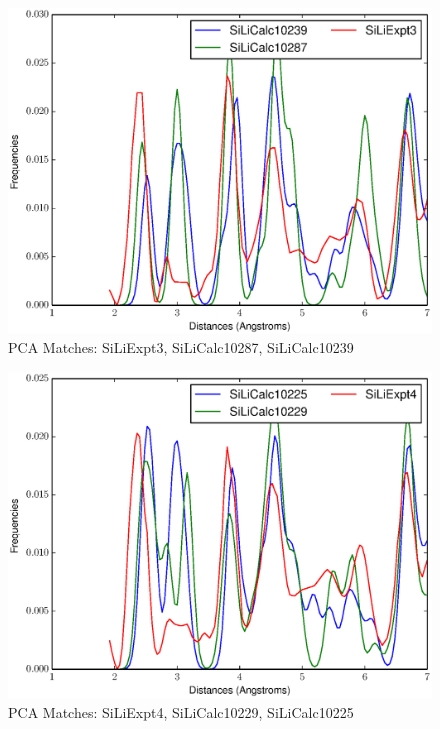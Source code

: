 \documentclass[12pt,letterpaper]{article}
\begin{document}
\begin{figure}[ht]
  \begin{center}
    \includegraphics[scale=0.8]{figs/PC3MatchSiLiExpt3-SiLiCalc10287-SiLiCalc10239.eps}
    \caption{PCA Matches: SiLiExpt3, SiLiCalc10287, SiLiCalc10239}
  \end{center}
\end{figure}

\begin{figure}[ht]
  \begin{center}
    \includegraphics[scale=0.8]{figs/PC3MatchSiLiExpt4-SiLiCalc10229-SiLiCalc10225.eps}
    \caption{PCA Matches: SiLiExpt4, SiLiCalc10229, SiLiCalc10225}
  \end{center}
\end{figure}
\end{document}

